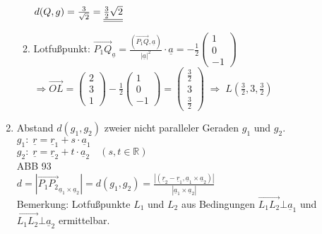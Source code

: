 \begin{enumerate}
\begin{enumerate}
$d(Q,g)= \frac{3}{\sqrt{2}}= \underline{\underline{\frac{3}{2} \sqrt{2}}}$
\item Lotfußpunkt: $\overrightarrow{P_1Q}_{\underline{a}}=\frac{\left(\overrightarrow{P_1Q}, \underline{a}\right)}{|\underline{a}|^2}\cdot \underline{a}=-\frac{1}{2}\begin{pmatrix}
1\\
0\\
-1
\end{pmatrix}$\\
$\Rightarrow \overrightarrow{OL}=\begin{pmatrix}
2\\
3\\
1
\end{pmatrix}-\frac{1}{2}\begin{pmatrix}
1\\
0\\
-1
\end{pmatrix}=\begin{pmatrix}
\tfrac{3}{2}\\
3\\
\tfrac{3}{2}
\end{pmatrix} \;\Rightarrow\;L\left(\frac{3}{2},3,\frac{3}{2}\right)$
\end{enumerate}
\item Abstand $d(g_1,g_2)$ zweier nicht paralleler Geraden $g_1$ und $g_2$.\\
$g_1: \; \underline{r}=\underline{r}_1 + s \cdot \underline{a}_1$\\
$g_2: \; \underline{r}=\underline{r}_2 + t \cdot \underline{a}_2 \quad (s,t \in \mathbb{R})$\\
ABB 93\\
$d=\left| \overrightarrow{P_1P_2}_{\underline{a}_1 \times \underline{a}_2}\right|=d(g_1,g_2)=\frac{|(\underline{r}_2-\underline{r}_1, \underline{a}_1 \times \underline{a}_2)|}{|\underline{a}_1 \times \underline{a}_2|}$\\
Bemerkung: Lotfußpunkte $L_1$ und $L_2$ aus Bedingungen $\overrightarrow{L_1L_2} \bot \underline{a}_1$ und $\overrightarrow{L_1L_2}\bot \underline{a}_2$ ermittelbar.
\end{enumerate}

